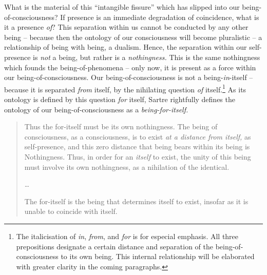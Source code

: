 What is the material of this \enquote{intangible fissure} which has slipped into our being-of-consciousness? If presence is an immediate degradation of coincidence, what is it a presence \emph{of}? This separation within us cannot be conducted by any other being -- because then the ontology of our consciousness will become pluralistic -- a relationship of being with being, a dualism.  Hence, the separation within our self-presence is \emph{not} a being, but rather is a \emph{nothingness.} This is the same nothingness which founds the being-of-phenomena -- only now, it is present as a force within our being-of-consciousness. Our being-of-consciousness is not a being-\emph{in}-itself -- because it is separated \emph{from} itself, by the nihilating question \emph{of} itself.\footnote{The italicisation of \emph{in}, \emph{from}, and \emph{for} is for especial emphasis. All three prepositions designate a certain distance and separation of the being-of-consciousness to its own being. This internal relationship will be elaborated with greater clarity in the coming paragraphs.} As its ontology is defined by this question \emph{for} itself, Sartre rightfully defines the ontology of our being-of-consciousness as a \emph{being-for-itself.}

\blockcquote[128]{Sartre}{%
    Thus the for-itself must be its own nothingness. The being of consciousness, as a consciousness, is to exist \emph{at a distance from itself,} as self-presence, and this zero distance that being bears within its being is Nothingness. Thus, in order for an \emph{itself} to exist, the unity of this being must involve its own nothingness, as a nihilation of the identical. 

    \ldots

    The for-itself is the being that determines itself to exist, insofar as it is unable to coincide with itself.
}



